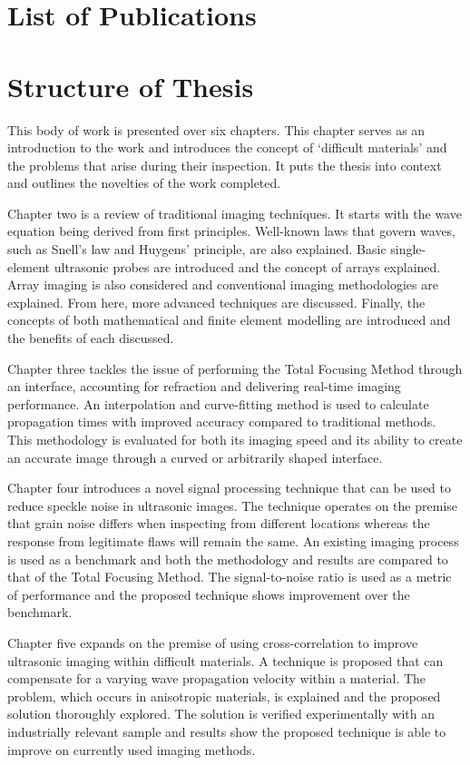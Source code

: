 \section{List of Publications}
\begin{itemize}

\end{itemize}
\section{Structure of Thesis}

This body of work is presented over six chapters. This chapter serves as an introduction to the work and introduces the concept of `difficult materials' and the problems that arise during their inspection. It puts the thesis into context and outlines the novelties of the work completed. 

Chapter two is a review of traditional imaging techniques. It starts with the wave equation being derived from first principles. Well-known laws that govern waves, such as Snell's law and Huygens' principle, are also explained. Basic single-element ultrasonic probes are introduced and the concept of arrays explained. Array imaging is also considered and conventional imaging methodologies are explained. From here, more advanced techniques are discussed.	Finally, the concepts of both mathematical and finite element modelling are introduced and the benefits of each discussed.

Chapter three tackles the issue of performing the Total Focusing Method through an interface, accounting for refraction and delivering real-time imaging performance. An interpolation and curve-fitting method is used to calculate propagation times with improved accuracy compared to traditional methods. This methodology is evaluated for both its imaging speed and its ability to create an accurate image through a curved or arbitrarily shaped interface. 

Chapter four introduces a novel signal processing technique that can be used to reduce speckle noise in ultrasonic images. The technique operates on the premise that grain noise differs when inspecting from different locations whereas the response from legitimate flaws will remain the same. An existing imaging process is used as a benchmark and both the methodology and results are compared to that of the Total Focusing Method. The signal-to-noise ratio is used as a metric of performance and the proposed technique shows improvement over the benchmark.

Chapter five expands on the premise of using cross-correlation to improve ultrasonic imaging within difficult materials. A technique is proposed that can compensate for a varying wave propagation velocity within a material. The problem, which occurs in anisotropic materials, is explained and the proposed solution thoroughly explored. The solution is verified experimentally with an industrially relevant sample and results show the proposed technique is able to improve on currently used imaging methods.

